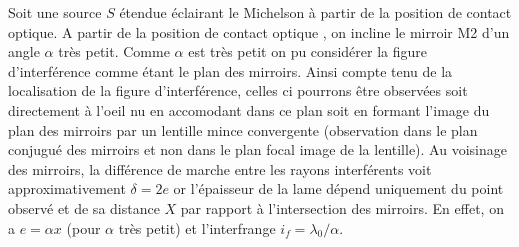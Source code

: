 \documentclass[a4paper,12pt]{article}
\theoremstyle{StyleTheo_will}
\theoremstyle{remark}
\begin{document}
Soit une source $S$ étendue éclairant le Michelson à partir de la position de contact optique. A partir de la position de contact optique , on incline le mirroir M2 d'un angle $\alpha$ très petit. Comme $\alpha$ est très petit on pu considérer la figure d'interférence comme étant le plan des mirroirs. Ainsi compte tenu de la localisation de la figure d'interférence, celles ci pourrons être observées soit directement à l'oeil nu en accomodant dans ce plan soit en formant l'image du plan des mirroirs par un lentille mince convergente (observation dans le plan conjugué des mirroirs et non dans le plan focal image de la lentille). Au voisinage des mirroirs, la différence de marche entre les rayons interférents voit approximativement $\delta = 2e$ or l'épaisseur de la lame dépend uniquement du point observé et de sa distance $X$ par rapport à l'intersection des mirroirs. En effet, on a $e= \alpha x$ (pour $\alpha$ très petit) et l'interfrange $i_f= \lambda_0/\alpha$.
\end{document}
